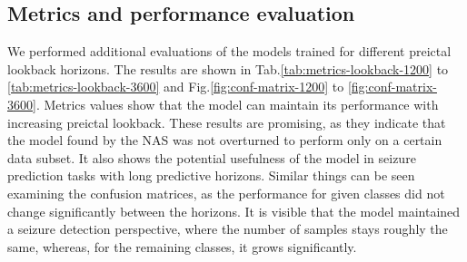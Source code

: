 \documentclass[a4paper,fleqn]{cas-sc}
\begin{document}
\subsection{Metrics and performance evaluation}
We performed additional evaluations of the models trained for different preictal lookback horizons. The results are shown in Tab.\ref{tab:metrics-lookback-1200} to \ref{tab:metrics-lookback-3600} and Fig.\ref{fig:conf-matrix-1200} to \ref{fig:conf-matrix-3600}. Metrics values show that the model can maintain its performance with increasing preictal lookback. These results are promising, as they indicate that the model found by the NAS was not overturned to perform only on a certain data subset. It also shows the potential usefulness of the model in seizure prediction tasks with long predictive horizons.
Similar things can be seen examining the confusion matrices, as the performance for given classes did not change significantly between the horizons. It is visible that the model maintained a seizure detection perspective, where the number of samples stays roughly the same, whereas, for the remaining classes, it grows significantly. 
\end{document}
